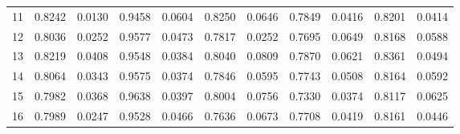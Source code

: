 \begin{tabular}{rrrrrrrrrrr}
        11 &   0.8242 & 0.0130 &               0.9458 & 0.0604 &                   0.8250 & 0.0646 &               0.7849 & 0.0416 &                       0.8201 & 0.0414 \\
        12 &   0.8036 & 0.0252 &               0.9577 & 0.0473 &                   0.7817 & 0.0252 &               0.7695 & 0.0649 &                       0.8168 & 0.0588 \\
        13 &   0.8219 & 0.0408 &               0.9548 & 0.0384 &                   0.8040 & 0.0809 &               0.7870 & 0.0621 &                       0.8361 & 0.0494 \\
        14 &   0.8064 & 0.0343 &               0.9575 & 0.0374 &                   0.7846 & 0.0595 &               0.7743 & 0.0508 &                       0.8164 & 0.0592 \\
        15 &   0.7982 & 0.0368 &               0.9638 & 0.0397 &                   0.8004 & 0.0756 &               0.7330 & 0.0374 &                       0.8117 & 0.0625 \\
        16 &   0.7989 & 0.0247 &               0.9528 & 0.0466 &                   0.7636 & 0.0673 &               0.7708 & 0.0419 &                       0.8161 & 0.0446 \\
\bottomrule
\end{tabular}
